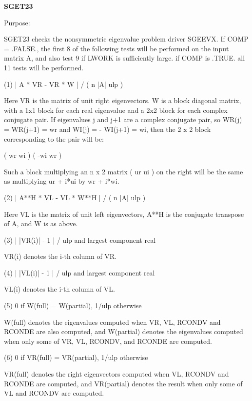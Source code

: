 {\bfseries S\+G\+E\+T23} 

\begin{DoxyParagraph}{Purpose\+: }
\begin{DoxyVerb}    SGET23  checks the nonsymmetric eigenvalue problem driver SGEEVX.
    If COMP = .FALSE., the first 8 of the following tests will be
    performed on the input matrix A, and also test 9 if LWORK is
    sufficiently large.
    if COMP is .TRUE. all 11 tests will be performed.

    (1)     | A * VR - VR * W | / ( n |A| ulp )

      Here VR is the matrix of unit right eigenvectors.
      W is a block diagonal matrix, with a 1x1 block for each
      real eigenvalue and a 2x2 block for each complex conjugate
      pair.  If eigenvalues j and j+1 are a complex conjugate pair,
      so WR(j) = WR(j+1) = wr and WI(j) = - WI(j+1) = wi, then the
      2 x 2 block corresponding to the pair will be:

              (  wr  wi  )
              ( -wi  wr  )

      Such a block multiplying an n x 2 matrix  ( ur ui ) on the
      right will be the same as multiplying  ur + i*ui  by  wr + i*wi.

    (2)     | A**H * VL - VL * W**H | / ( n |A| ulp )

      Here VL is the matrix of unit left eigenvectors, A**H is the
      conjugate transpose of A, and W is as above.

    (3)     | |VR(i)| - 1 | / ulp and largest component real

      VR(i) denotes the i-th column of VR.

    (4)     | |VL(i)| - 1 | / ulp and largest component real

      VL(i) denotes the i-th column of VL.

    (5)     0 if W(full) = W(partial), 1/ulp otherwise

      W(full) denotes the eigenvalues computed when VR, VL, RCONDV
      and RCONDE are also computed, and W(partial) denotes the
      eigenvalues computed when only some of VR, VL, RCONDV, and
      RCONDE are computed.

    (6)     0 if VR(full) = VR(partial), 1/ulp otherwise

      VR(full) denotes the right eigenvectors computed when VL, RCONDV
      and RCONDE are computed, and VR(partial) denotes the result
      when only some of VL and RCONDV are computed.


\end{DoxyVerb}
\end{DoxyParagraph}
